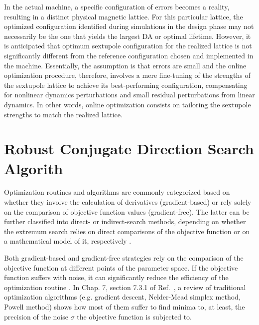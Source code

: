In the actual machine, a specific configuration of errors becomes a reality, resulting in a distinct physical magnetic lattice. For this particular lattice, the optimized configuration identified during simulations in the design phase may not necessarily be the one that yields the largest DA or optimal lifetime. However, it is anticipated that optimum sextupole configuration for the realized lattice is not significantly different from the reference configuration chosen and implemented in the machine. Essentially, the assumption is that errors are small and the online optimization procedure, therefore, involves a mere fine-tuning of the strengths of the sextupole lattice to achieve its best-performing configuration, compensating for nonlinear dynamics perturbations and small residual perturbations from linear dynamics. In other words, online optimization consists on tailoring the sextupole strengths to match the realized lattice.

\section{Robust Conjugate Direction Search Algorith}
Optimization routines and algorithms are commonly categorized based on whether they involve the calculation of derivatives (gradient-based) or rely solely on the comparison of objective function values (gradient-free). The latter can be further classified into direct- or indirect-search methods, depending on whether the extremum search relies on direct comparisons of the objective function or on a mathematical model of it, respectively \cite{press_numerical_2007}.

Both gradient-based and gradient-free strategies rely on the comparison of the objective function at different points of the parameter space. If the objective function suffers with noise, it can significantly reduce the efficiency of the optimization routine \cite{press_numerical_2007, huang_beam-based_2019}. In Chap. 7, section 7.3.1 of Ref.~\cite{huang_beam-based_2019}, a review of traditional optimization algorithms (e.g. gradient descent, Nelder-Mead simplex method, Powell method) shows how most of them suffer to find minima to, at least, the precision of the noise $\sigma$ the objective function is subjected to.

